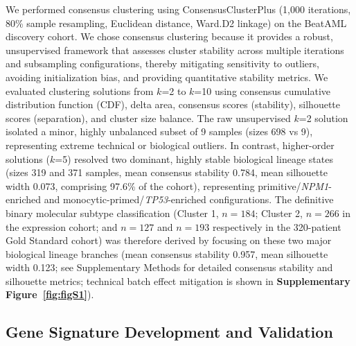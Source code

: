 \documentclass[11pt,a4paper]{article}
\begin{document}
We performed consensus clustering using ConsensusClusterPlus (1,000 iterations, 80\% sample resampling, Euclidean distance, Ward.D2 linkage) \cite{wilkerson2010consensuscluster} on the BeatAML discovery cohort. We chose consensus clustering because it provides a robust, unsupervised framework that assesses cluster stability across multiple iterations and subsampling configurations, thereby mitigating sensitivity to outliers, avoiding initialization bias, and providing quantitative stability metrics. We evaluated clustering solutions from $k$=2 to $k$=10 using consensus cumulative distribution function (CDF), delta area, consensus scores (stability), silhouette scores (separation), and cluster size balance. The raw unsupervised $k$=2 solution isolated a minor, highly unbalanced subset of 9 samples (sizes 698 vs 9), representing extreme technical or biological outliers. In contrast, higher-order solutions ($k$=5) resolved two dominant, highly stable biological lineage states (sizes 319 and 371 samples, mean consensus stability 0.784, mean silhouette width 0.073, comprising 97.6\% of the cohort), representing primitive\slash\allowbreak\textit{NPM1}\allowbreak-enriched and monocytic\allowbreak-primed\slash\allowbreak\textit{TP53}\allowbreak-enriched configurations. The definitive binary molecular subtype classification (Cluster 1, $n=184$; Cluster 2, $n=266$ in the expression cohort; and $n=127$ and $n=193$ respectively in the 320-patient Gold Standard cohort) was therefore derived by focusing on these two major biological lineage branches (mean consensus stability 0.957, mean silhouette width 0.123; see Supplementary Methods for detailed consensus stability and silhouette metrics; technical batch effect mitigation is shown in \textbf{Supplementary Figure~\ref{fig:figS1}}).

\subsection{Gene Signature Development and Validation}
\end{document}
